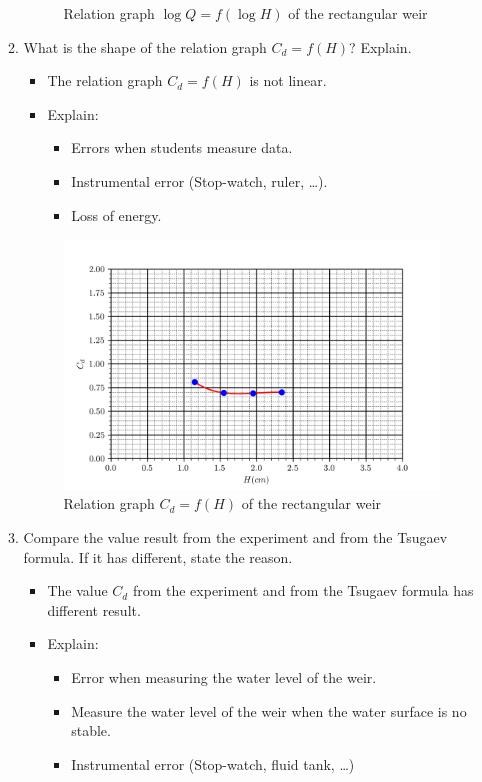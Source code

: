 \begin{enumerate}[label=\textbf{\Alph*.}]
\begin{enumerate}
\begin{figure}[H]
			\caption{Relation graph $\log Q = f(\log H)$ of the rectangular weir}
			\label{fig1lab6}
		\end{figure}
		\item What is the shape of the relation graph $C_d=f(H)$? Explain.
		\begin{itemize}[label=-]
			\item The relation graph $C_d=f(H)$ is not linear.
			\item Explain:
			\begin{itemize}[label=+]
				\item Errors when students measure data.
				\item Instrumental error (Stop-watch, ruler, …).
				\item Loss of energy.
			\end{itemize}
		\end{itemize}
		\begin{figure}[H]
			\centering
			\includegraphics[width=150mm]{photos/fig2lab6.png}
			\caption{Relation graph $C_d=f(H)$ of the rectangular weir}
			\label{fig2lab6}
		\end{figure}
	\item Compare the value result from the experiment and from the Tsugaev formula. If it has different, state the reason.
	\begin{itemize}[label=-]
		\item The value $C_d$ from the experiment and from the Tsugaev formula has different result.
		\item Explain:
		\begin{itemize}[label=+]
			\item Error when measuring the water level of the weir.
			\item Measure the water level of the weir when the water surface is no stable.
			\item Instrumental error (Stop-watch, fluid tank, …)
		\end{itemize}
	\end{itemize}
	\end{enumerate}
\end{enumerate}
